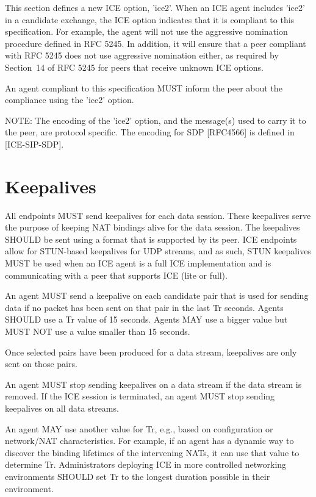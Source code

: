 \documentclass{article}
\begin{document}
This section defines a new ICE option, 'ice2'.  When an ICE agent includes 'ice2' in a candidate exchange, the ICE option indicates that it is compliant to this specification.  For example, the agent will not use the aggressive nomination procedure defined in RFC 5245. In addition, it will ensure that a peer compliant with RFC 5245 does not use aggressive nomination either, as required by Section~14 of RFC 5245 for peers that receive unknown ICE options.

An agent compliant to this specification MUST inform the peer about the compliance using the 'ice2' option.

NOTE: The encoding of the 'ice2' option, and the message(s) used to carry it to the peer, are protocol specific.  The encoding for SDP [RFC4566] is defined in [ICE-SIP-SDP].

\section{Keepalives}

All endpoints MUST send keepalives for each data session.  These keepalives serve the purpose of keeping NAT bindings alive for the data session.  The keepalives SHOULD be sent using a format that is supported by its peer.  ICE endpoints allow for STUN-based keepalives for UDP streams, and as such, STUN keepalives MUST be used when an ICE agent is a full ICE implementation and is communicating with a peer that supports ICE (lite or full).

An agent MUST send a keepalive on each candidate pair that is used for sending data if no packet has been sent on that pair in the last Tr seconds.  Agents SHOULD use a Tr value of 15 seconds.  Agents MAY use a bigger value but MUST NOT use a value smaller than 15 seconds.

Once selected pairs have been produced for a data stream, keepalives are only sent on those pairs.

An agent MUST stop sending keepalives on a data stream if the data stream is removed.  If the ICE session is terminated, an agent MUST stop sending keepalives on all data streams.

An agent MAY use another value for Tr, e.g., based on configuration or network/NAT characteristics.  For example, if an agent has a dynamic way to discover the binding lifetimes of the intervening NATs, it can use that value to determine Tr.  Administrators deploying ICE in more controlled networking environments SHOULD set Tr to the longest duration possible in their environment.
\end{document}
